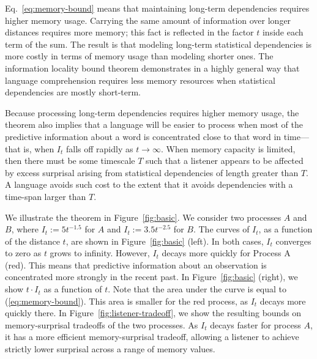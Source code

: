 Eq.~\ref{eq:memory-bound} means that maintaining long-term dependencies requires higher memory usage. Carrying the same amount of information over longer distances requires more memory; this fact is reflected in the factor $t$ inside each term of the sum. 
The result is that modeling long-term statistical dependencies is more costly in terms of memory usage than modeling shorter ones.
The information locality bound theorem demonstrates in a highly general way that language comprehension requires less memory resources when statistical dependencies are mostly short-term. 

Because processing long-term dependencies requires higher memory usage, the theorem also implies that a language will be easier to process when most of the predictive information about a word is concentrated close to that word in time---that is, when $I_t$ falls off rapidly as $t \rightarrow \infty$. When memory capacity is limited, then there must be some timescale $T$ such that a listener appears to be affected by excess surprisal arising from statistical dependencies of length greater than $T$. A language avoids such cost to the extent that it avoids dependencies with a time-span larger than $T$.

We illustrate the theorem in Figure~\ref{fig:basic}.
We consider two processes $A$ and $B$, where $I_t := 5t^{-1.5}$ for $A$ and $I_t := 3.5 t^{-2.5}$ for $B$.
The curves of $I_t$, as a function of the distance $t$, are shown in Figure~\ref{fig:basic} (left).
In both cases, $I_t$ converges to zero as $t$ grows to infinity. 
However, $I_t$ decays more quickly for Process A (red).
This means that predictive information about an observation is concentrated more strongly in the recent past.
In Figure~\ref{fig:basic} (right), we show $t\cdot I_t$ as a function of $t$.
Note that the area under the curve is equal to (\ref{eq:memory-bound}).
This area is smaller for the red process, as $I_t$ decays more quickly there.  
In Figure~\ref{fig:listener-tradeoff}, we show the resulting bounds on memory-surprisal tradeoffs of the two processes.  
As $I_t$ decays faster for process $A$, it has a more efficient memory-surprisal tradeoff, allowing a listener to achieve strictly lower surprisal across a range of memory values.



